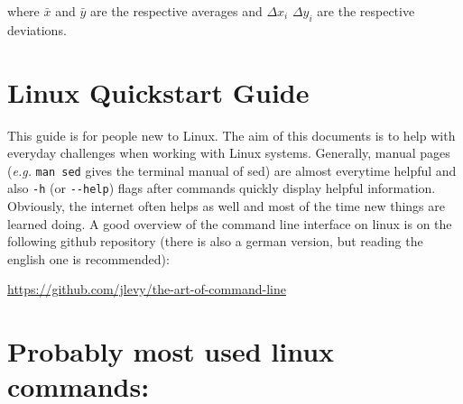 \documentclass[
  letterpaper,
  DIV=11,
  numbers=noendperiod]{scrreprt}
\begin{document}
where \(\bar{x}\) and \(\bar{y}\) are the respective averages and
\(\Delta x_i\) \(\Delta y_i\) are the respective deviations.

\hypertarget{linux-quickstart-guide}{%
\chapter{Linux Quickstart Guide}\label{linux-quickstart-guide}}

This guide is for people new to Linux. The aim of this documents is to
help with everyday challenges when working with Linux systems.
Generally, manual pages (\emph{e.g.} \texttt{man\ sed} gives the
terminal manual of sed) are almost everytime helpful and also
\texttt{-h} (or \texttt{-\/-help}) flags after commands quickly display
helpful information. Obviously, the internet often helps as well and
most of the time new things are learned doing. A good overview of the
command line interface on linux is on the following github repository
(there is also a german version, but reading the english one is
recommended):

\url{https://github.com/jlevy/the-art-of-command-line}

\hypertarget{probably-most-used-linux-commands}{%
\chapter*{Probably most used linux
commands:}\label{probably-most-used-linux-commands}}

\end{document}
